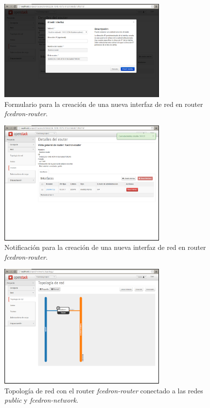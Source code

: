 \documentclass{article}
\begin{document}
\begin{figure}[h]
  \centering
    \includegraphics[width=0.75\textwidth]{img/m_024.png}
  \caption{Formulario para la creación de una nueva interfaz de red en router \emph{fcedron-router}.}
  \label{fig:RouterCreateFormInterface}
\end{figure}	

\begin{figure}[h]
  \centering
    \includegraphics[width=0.75\textwidth]{img/m_025.png}
  \caption{Notificación para la creación de una nueva interfaz de red en router \emph{fcedron-router}.}
  \label{fig:RouterCreateInterface}
\end{figure}	

\begin{figure}[h]
  \centering
    \includegraphics[width=0.75\textwidth]{img/m_026.png}
  \caption{Topología de red con el router \emph{fcedron-router} conectado a las redes \emph{public} y \emph{fcedron-network}.}
  \label{fig:NetworkRouterPublicPrivate}
\end{figure}	
\end{document}
